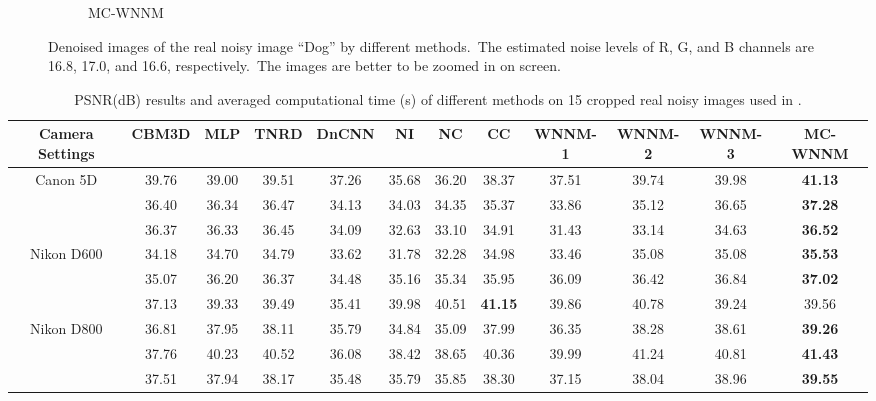 \begin{figure}
\begin{subfigure}[t]{0.19\textwidth}
		\caption{MC-WNNM}
    \end{subfigure}
    \caption{Denoised images of the real noisy image ``Dog'' \cite{ncwebsite} by different methods.\ The estimated noise levels of R, G, and B channels are 16.8, 17.0, and 16.6, respectively.\ The images are better to be zoomed in on screen.}
    \label{fig3}
\end{figure}


\begin{table}
\caption{PSNR(dB) results and averaged computational time (s) of different methods on 15 cropped real noisy images used in \cite{crosschannel2016}.}
\label{t2}
\label{tabb}
\begin{center}
\renewcommand\arraystretch{1}
\scriptsize
\begin{tabular}{|c||c|c|c|c|c|c|c|c|c|c|c|}
\hline
Camera Settings  
&
\textbf{CBM3D}
&
\textbf{MLP}
&
\textbf{TNRD}
&
\textbf{DnCNN}
&
\textbf{NI}
&
\textbf{NC}
&
\textbf{CC}
&
\textbf{WNNM-1}
&
\textbf{WNNM-2}
&
\textbf{WNNM-3}
&
\textbf{MC-WNNM} 
\\
\hline
\multirow{3}{*}{\small{Canon 5D}} %
& 39.76 & 39.00 & 39.51 & 37.26 & 35.68 & 36.20 & 38.37 & 37.51 & 39.74 & 39.98 & \textbf{41.13}
\\ 
\cline{2-12} 
\multirow{3}{*}{ISO = 3200}   
& 36.40 & 36.34 & 36.47 & 34.13 & 34.03 & 34.35 & 35.37 & 33.86 & 35.12 & 36.65 & \textbf{37.28}
\\ 
\cline{2-12}    
& 36.37 & 36.33 & 36.45 & 34.09 & 32.63 & 33.10 & 34.91 & 31.43 & 33.14 & 34.63 & \textbf{36.52}  
\\
\hline
\multirow{3}{*}{Nikon D600} 
& 34.18 & 34.70 & 34.79 & 33.62 & 31.78 & 32.28 & 34.98 & 33.46 & 35.08 & 35.08 & \textbf{35.53}
\\ 
\cline{2-12} 
\multirow{3}{*}{ISO = 3200}   
& 35.07 & 36.20 & 36.37 & 34.48 & 35.16 & 35.34 & 35.95 & 36.09 & 36.42 & 36.84 & \textbf{37.02}
\\ 
\cline{2-12}    
& 37.13 & 39.33 & 39.49 & 35.41 & 39.98 & 40.51 & \textbf{41.15} & 39.86 & 40.78 & 39.24 & 39.56
\\
\hline
\multirow{3}{*}{Nikon D800} 
& 36.81  & 37.95 & 38.11 & 35.79 & 34.84 & 35.09 & 37.99 & 36.35 & 38.28 & 38.61 & \textbf{39.26}
\\ 
\cline{2-12} 
\multirow{3}{*}{ISO = 1600}   
& 37.76 & 40.23 & 40.52 & 36.08 & 38.42 & 38.65 & 40.36 & 39.99 & 41.24 & 40.81 & \textbf{41.43}
\\ 
\cline{2-12}    
& 37.51 & 37.94 & 38.17 & 35.48 & 35.79 & 35.85 & 38.30 & 37.15 & 38.04 & 38.96 & \textbf{39.55}

\end{tabular}
\end{center}
\end{table}
